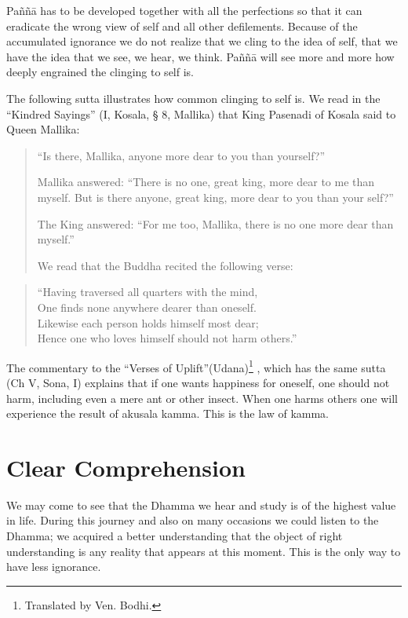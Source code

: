 Paññā has to be developed together with all the perfections so that it can eradicate the 
wrong view of self and all other defilements. Because of the accumulated ignorance 
we do not realize that we cling to the idea of self, that we have the idea that we see, 
we hear, we think. Paññā will see more and more how deeply engrained the clinging 
to self is. 

The following sutta illustrates how common clinging to self is. We read in the ``Kindred Sayings'' (I, Kosala, § 8, Mallika) that King Pasenadi of Kosala said to Queen 
Mallika: 

\begin{quote}

“Is there, Mallika, anyone more dear to you than yourself?'' 

Mallika answered: ``There is no one, great king, more dear to me than 
myself. But is there anyone, great king, more dear to you than your 
self?'' 

The King answered: ``For me too, Mallika, there is no one more dear 
than myself.'' 

We read that the Buddha recited the following verse: 

\end{quote}

\begin{verse}

“Having traversed all quarters with the mind,\\ 
One finds none anywhere dearer than oneself. \\
Likewise each person holds himself most dear;\\ 
Hence one who loves himself should not harm others.'' 
\end{verse}

The commentary to the ``Verses of Uplift''(Udana)\footnote{Translated by Ven. Bodhi.} , which has the same sutta (Ch V, 
Sona, I) explains that if one wants happiness for oneself, one should not harm, including even a mere ant or other insect. When one harms others one will experience 
the result of akusala kamma. This is the law of kamma. 







\chapter{Clear Comprehension} 


We may come to see that the Dhamma we hear and study is of the highest value in 
life. During this journey and also on many occasions we could listen to the Dhamma; 
we acquired a better understanding that the object of right understanding is any reality that appears at this moment. This is the only way to have less ignorance. 


